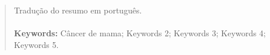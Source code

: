 \begin{otherlanguage}{english}
    \begin{abstract}
        Tradução do resumo em português.
        \\ \\
        \textbf{Keywords:} Câncer de mama; Keywords 2; Keywords 3; Keywords 4; Keywords 5.
    \end{abstract}
\end{otherlanguage}